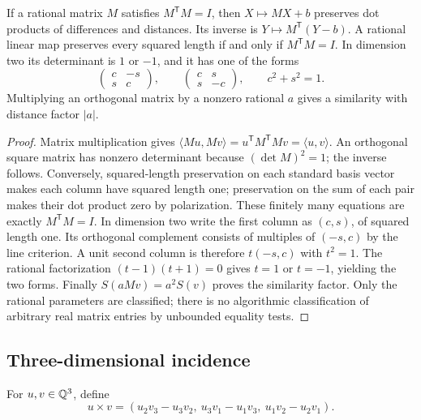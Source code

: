 \begin{theorem}
\label{geo:isometries}
If a rational matrix $M$ satisfies $M^{\mathsf T}M=I$, then $X\mapsto MX+b$
preserves dot products of differences and distances. Its inverse is
$Y\mapsto M^{\mathsf T}(Y-b)$. A rational linear map preserves every squared
length if and only if $M^{\mathsf T}M=I$. In dimension two its determinant
is $1$ or $-1$, and it has one of the forms
\[
 \begin{pmatrix}c&-s\\s&c\end{pmatrix},\qquad
 \begin{pmatrix}c&s\\s&-c\end{pmatrix},\qquad c^2+s^2=1.
\]
Multiplying an orthogonal matrix by a nonzero rational $a$ gives a similarity
with distance factor $|a|$.
\end{theorem}
\begin{proof}
Matrix multiplication gives
$\langle Mu,Mv\rangle=u^{\mathsf T}M^{\mathsf T}Mv=\langle u,v\rangle$.
An orthogonal square matrix has nonzero determinant because
$(\det M)^2=1$; the inverse follows. Conversely, squared-length preservation
on each standard basis vector makes each column have squared length one;
preservation on the sum of each pair makes their dot product zero by
polarization. These finitely many equations are exactly $M^{\mathsf T}M=I$.
In dimension two write the first column as $(c,s)$, of squared length one.
Its orthogonal complement consists of multiples of $(-s,c)$ by the line
criterion. A unit second column is therefore $t(-s,c)$ with $t^2=1$.
The rational factorization $(t-1)(t+1)=0$ gives $t=1$ or $t=-1$, yielding
the two forms. Finally $S(aMv)=a^2S(v)$ proves the similarity factor.
Only the rational parameters are classified; there is no algorithmic
classification of arbitrary real matrix entries by unbounded equality tests.
\end{proof}

\subsection{Three-dimensional incidence}

For $u,v\in\mathbb Q^3$, define
\[
 u\mathbin{\times}v=(u_2v_3-u_3v_2,\ u_3v_1-u_1v_3,\ u_1v_2-u_2v_1).
\]

